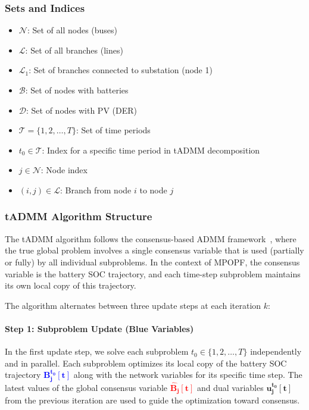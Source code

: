 \subsubsection{Sets and Indices}
\begin{itemize}
    \item $\mathcal{N}$: Set of all nodes (buses)
    \item $\mathcal{L}$: Set of all branches (lines)
    \item $\mathcal{L}_1$: Set of branches connected to substation (node 1)
    \item $\mathcal{B}$: Set of nodes with batteries
    \item $\mathcal{D}$: Set of nodes with PV (DER)
    \item $\mathcal{T} = \{1, 2, \ldots, T\}$: Set of time periods
    \item $t_0 \in \mathcal{T}$: Index for a specific time period in tADMM decomposition
    \item $j \in \mathcal{N}$: Node index
    \item $(i,j) \in \mathcal{L}$: Branch from node $i$ to node $j$
\end{itemize}

\subsubsection{tADMM Algorithm Structure}

The tADMM algorithm follows the consensus-based ADMM framework~\cite{admm_boyd_website, admm_cmu_notes}, where the true global problem involves a single consensus variable that is used (partially or fully) by all individual subproblems. In the context of MPOPF, the consensus variable is the battery SOC trajectory, and each time-step subproblem maintains its own local copy of this trajectory.

The algorithm alternates between three update steps at each iteration $k$:

\paragraph{Step 1: Subproblem Update (Blue Variables)}

In the first update step, we solve each subproblem $t_0 \in \{1, 2, \ldots, T\}$ independently and in parallel. Each subproblem optimizes its local copy of the battery SOC trajectory \textcolor{blue}{$\mathbf{B_j^{t_0}[t]}$} along with the network variables for its specific time step. The latest values of the global consensus variable \textcolor{red}{$\mathbf{\hat{B}_j[t]}$} and dual variables \textcolor{green!60!black}{$\mathbf{u_j^{t_0}[t]}$} from the previous iteration are used to guide the optimization toward consensus.


